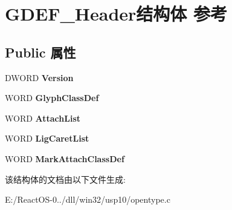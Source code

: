 \hypertarget{struct_g_d_e_f___header}{}\section{G\+D\+E\+F\+\_\+\+Header结构体 参考}
\label{struct_g_d_e_f___header}
\subsection*{Public 属性}
\begin{DoxyCompactItemize}
\item 
\mbox{\label{struct_g_d_e_f___header_afa2cfe979b4d3c4827490bd7a609f317}} 
D\+W\+O\+RD {\bfseries Version}
\item 
\mbox{\label{struct_g_d_e_f___header_abfa040c8ad49388af07bb336b85c08c1}} 
W\+O\+RD {\bfseries Glyph\+Class\+Def}
\item 
\mbox{\label{struct_g_d_e_f___header_a49e8860d417e7ba82fe3091deae593e2}} 
W\+O\+RD {\bfseries Attach\+List}
\item 
\mbox{\label{struct_g_d_e_f___header_a3aa22b311c30c69189e8f34c30689159}} 
W\+O\+RD {\bfseries Lig\+Caret\+List}
\item 
\mbox{\label{struct_g_d_e_f___header_a26ff6e25a9a5b36109c7c9608d6480ae}} 
W\+O\+RD {\bfseries Mark\+Attach\+Class\+Def}
\end{DoxyCompactItemize}


该结构体的文档由以下文件生成\+:\begin{DoxyCompactItemize}
\item 
E\+:/\+React\+O\+S-\/0../dll/win32/usp10/opentype.\+c\end{DoxyCompactItemize}
